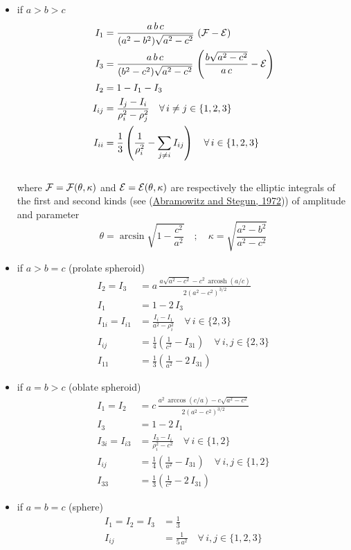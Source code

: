 \documentclass[
  letterpaper,
  DIV=11,
  numbers=noendperiod]{scrreprt}
\providecommand{\tightlist}{%
  \setlength{\itemsep}{0pt}\setlength{\parskip}{0pt}}\usepackage{longtable,booktabs,array}
\DeclareMathOperator{\arcosh}{arcosh}
\begin{document}
\begin{itemize}
\tightlist
\item
  if \(a > b > c\) \[\begin{aligned}
    I_1&=\frac{a\,b\,c}{(a^2-b^2)\sqrt{a^2-c^2}}\,
    \left({\cal F}-{\cal E}\right)\\
    I_3&=\frac{a\,b\,c}{(b^2-c^2)\sqrt{a^2-c^2}}\,
    \left(\frac{b\sqrt{a^2-c^2}}{a\,c}-
    {\cal E}\right)\\
    I_2&=1-I_1-I_3\\
    I_{ij}&=\frac{I_j-I_i}{\rho_i^2-\rho_j^2}\quad\forall\, i\neq j\in\{1,2,3\}\\
    I_{ii}&=\frac{1}{3}\left(
    \frac{1}{\rho_i^2}-
    \sum_{j\neq i}I_{ij} \right) 
    \quad\forall\, i\in\{1,2,3\}
    \end{aligned}\]\\
  where \({\cal F}={\cal F}(\theta,\kappa)\) and
  \({\cal E}={\cal E}(\theta,\kappa)\) are respectively the elliptic
  integrals of the first and second kinds (see
  (\protect\hyperlink{ref-abramowitz1972}{Abramowitz and Stegun, 1972}))
  of amplitude and parameter \[
    \theta=\arcsin{\sqrt{1-\frac{c^2}{a^2}}}
    \quad;\quad
    \kappa=\sqrt{\frac{a^2-b^2}{a^2-c^2}}
    \]
\item
  if \(a > b = c\) (prolate spheroid) \[\begin{aligned}
    I_2=I_3&=a\,
    \frac{a\sqrt{a^2-c^2}-c^2\,\arcosh{(a/c)}}
    {2\left(a^2-c^2\right)^{3/2}}\\
    I_1&=1-2\,I_3\\
    I_{1i}=I_{i1}&=\frac{I_i-I_1}{a^2-\rho_i^2}\quad
    \forall\, i\in\{2,3\}\\
    I_{ij}&=\frac{1}{4}
    \left(\frac{1}{c^2}-I_{31} \right) 
    \quad\forall\, i,j\in\{2,3\}\\
    I_{11}&=\frac{1}{3}
    \left(\frac{1}{a^2}-2\,I_{31} \right)
    \end{aligned}\]
\item
  if \(a = b > c\) (oblate spheroid) \[\begin{aligned}
    I_1=I_2&=c\,
    \frac{a^2\,\arccos{(c/a)}-c\sqrt{a^2-c^2}}
    {2\left(a^2-c^2\right)^{3/2}}\\
    I_3&=1-2\,I_1\\
    I_{3i}=I_{i3}&=\frac{I_3-I_i}{\rho_i^2-c^2}\quad
    \forall\, i\in\{1,2\}\\
    I_{ij}&=\frac{1}{4}
    \left(\frac{1}{a^2}-I_{31} \right) 
    \quad\forall\, i,j\in\{1,2\}\\
    I_{33}&=\frac{1}{3}
    \left(\frac{1}{c^2}-2\,I_{31} \right)
    \end{aligned}\]
\item
  if \(a = b = c\) (sphere) \[\begin{aligned}
    I_1=I_2=I_3&=\frac{1}{3}\\
    I_{ij}&=\frac{1}{5\,a^2}\quad\forall\, i,j\in\{1,2,3\}
    \end{aligned}\]
\end{itemize}
\end{document}

